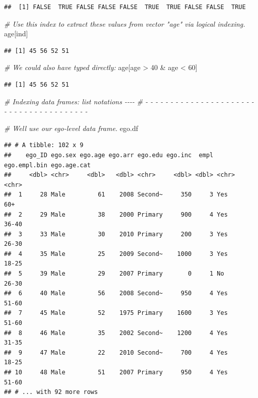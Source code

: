 \documentclass[
]{book}
\newenvironment{Shaded}{\begin{snugshade}}{\end{snugshade}}
\newcommand{\CommentTok}[1]{\textcolor[rgb]{0.56,0.35,0.01}{\textit{#1}}}
\newcommand{\DecValTok}[1]{\textcolor[rgb]{0.00,0.00,0.81}{#1}}
\newcommand{\NormalTok}[1]{#1}
\newcommand{\SpecialCharTok}[1]{\textcolor[rgb]{0.00,0.00,0.00}{#1}}
\begin{document}
\begin{verbatim}
##  [1] FALSE  TRUE FALSE FALSE FALSE  TRUE  TRUE FALSE FALSE  TRUE
\end{verbatim}

\begin{Shaded}
\begin{Highlighting}[]
\CommentTok{\# Use this index to extract these values from vector "age" via logical indexing.}
\NormalTok{age[ind]}
\end{Highlighting}
\end{Shaded}

\begin{verbatim}
## [1] 45 56 52 51
\end{verbatim}

\begin{Shaded}
\begin{Highlighting}[]
\CommentTok{\# We could also have typed directly:}
\NormalTok{age[age }\SpecialCharTok{\textgreater{}} \DecValTok{40} \SpecialCharTok{\&}\NormalTok{ age }\SpecialCharTok{\textless{}} \DecValTok{60}\NormalTok{]}
\end{Highlighting}
\end{Shaded}

\begin{verbatim}
## [1] 45 56 52 51
\end{verbatim}

\begin{Shaded}
\begin{Highlighting}[]
\CommentTok{\# Indexing data frames: list notations                                      {-}{-}{-}{-} }
\CommentTok{\# {-} {-} {-} {-} {-} {-} {-} {-} {-} {-} {-} {-} {-} {-} {-} {-} {-} {-} {-} {-} {-} {-} {-} {-} {-} {-} {-} {-} {-} {-} {-} {-} {-} {-} {-} {-} {-} {-} {-} }

\CommentTok{\# We\textquotesingle{}ll use our ego{-}level data frame.}
\NormalTok{ego.df}
\end{Highlighting}
\end{Shaded}

\begin{verbatim}
## # A tibble: 102 x 9
##    ego_ID ego.sex ego.age ego.arr ego.edu ego.inc  empl ego.empl.bin ego.age.cat
##     <dbl> <chr>     <dbl>   <dbl> <chr>     <dbl> <dbl> <chr>        <chr>      
##  1     28 Male         61    2008 Second~     350     3 Yes          60+        
##  2     29 Male         38    2000 Primary     900     4 Yes          36-40      
##  3     33 Male         30    2010 Primary     200     3 Yes          26-30      
##  4     35 Male         25    2009 Second~    1000     3 Yes          18-25      
##  5     39 Male         29    2007 Primary       0     1 No           26-30      
##  6     40 Male         56    2008 Second~     950     4 Yes          51-60      
##  7     45 Male         52    1975 Primary    1600     3 Yes          51-60      
##  8     46 Male         35    2002 Second~    1200     4 Yes          31-35      
##  9     47 Male         22    2010 Second~     700     4 Yes          18-25      
## 10     48 Male         51    2007 Primary     950     4 Yes          51-60      
## # ... with 92 more rows
\end{verbatim}
\end{document}
